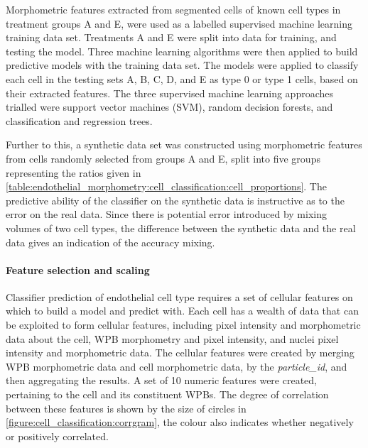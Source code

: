 Morphometric features extracted from segmented cells of known cell types in treatment groups A and E, were used as a labelled supervised machine learning training data set. Treatments A and E were split into data for training, and testing the model. Three machine learning algorithms were then applied to build predictive models with the training data set. The models were applied to classify each cell in the testing sets A, B, C, D, and E as type 0 or type 1 cells, based on their extracted features. The three supervised machine learning approaches trialled were support vector machines (SVM), random decision forests, and classification and regression trees.

Further to this, a synthetic data set was constructed using morphometric features from cells randomly selected from groups A and E, split into five groups representing the ratios given in \autoref{table:endothelial_morphometry:cell_classification:cell_proportions}. The predictive ability of the classifier on the synthetic data is instructive as to the error on the real data. Since there is potential error introduced by mixing volumes of two cell types, the difference between the synthetic data and the real data gives an indication of the accuracy mixing.

\paragraph{Feature selection and scaling}
Classifier prediction of endothelial cell type requires a set of cellular features on which to build a model and predict with. Each cell has a wealth of data that can be exploited to form cellular features, including pixel intensity and morphometric data about the cell, WPB morphometry and pixel intensity, and nuclei pixel intensity and morphometric data. The cellular features were created by merging WPB morphometric data and cell morphometric data, by the \emph{particle\_id}, and then aggregating the results. A set of 10 numeric features were created, pertaining to the cell and its constituent WPBs. The degree of correlation between these features is shown by the size of circles in \autoref{figure:cell_classification:corrgram}, the colour also indicates whether negatively or positively correlated.

